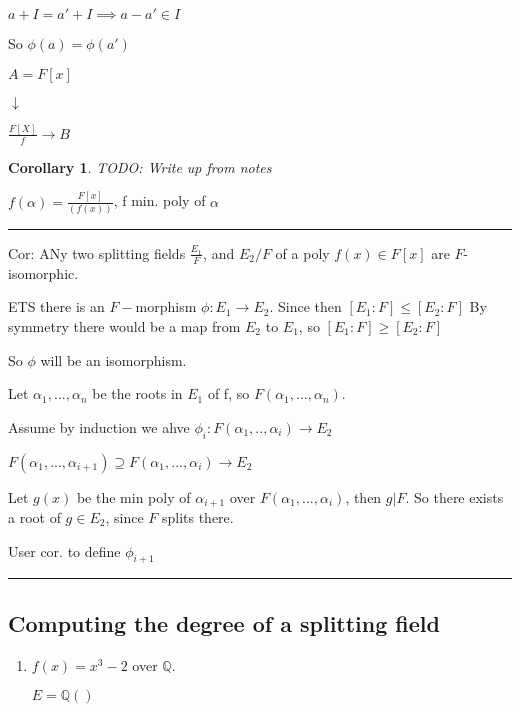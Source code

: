 \documentclass[twoside]{article}
\newcommand{\Q}{\mathbb{Q}}
\newtheorem{corollary}[theorem]{Corollary}
\newenvironment{proof}{{\bf Proof:}}{\hfill\rule{2mm}{2mm}}
\begin{document}
    $a + I = a'+I \implies a - a' \in I$

    So $\phi(a) = \phi(a')$

    $A = F[x]$

    $\downarrow$ 
    
    $\frac{F[X]}{f} \rightarrow B$


    \begin{corollary}
        TODO: Write up from notes
    \end{corollary}

    \begin{proof}
        $f(\alpha) = \frac{F[x]}{(f(x))}$, f min. poly of $\alpha$
    \end{proof}

    Cor: ANy two splitting fields $\frac{E_1}{F}$, and $E_2/F$ of a poly $f(x) \in F[x]$ are $F$-isomorphic. 

    \begin{proof}
        ETS there is an $F-$morphism $\phi:E_1 \rightarrow E_2$. Since then $[E_1:F] \leq [E_2:F]$
        By symmetry there would be a map from $E_2$ to $E_1$, so $[E_1:F] \geq [E_2:F]$

        So $\phi$ will be an isomorphism. 

        Let $\alpha_1, ..., \alpha_n$ be the roots in $E_1$ of f, so $F(\alpha_1, ..., \alpha_n)$.

        Assume by induction we ahve $\phi_i: F(\alpha_1, .., \alpha_i) \rightarrow E_2$

        $F(\alpha_1,..., \alpha_{i+1}) \supseteq F(\alpha_1, ...,\alpha_{i}) \rightarrow E_2$

        Let $g(x)$ be the min poly of $\alpha_{i+1}$ over $F(\alpha_1, ..., \alpha_i)$, then $g \vert F$. So there exists a root of $g \in E_2$, since $F$ splits there. 

        User cor. to define $\phi_{i+1}$
    \end{proof}
    \subsection{Computing the degree of a splitting field}

    \begin{enumerate}
        \item $f(x) = x^3 -2$ over $\Q$.

        $E = \Q()$
    \end{enumerate}
\end{document}
